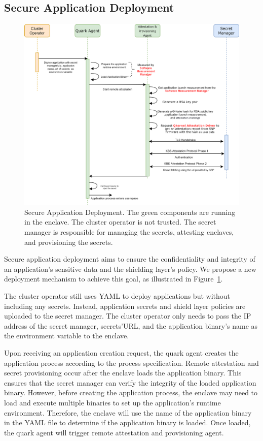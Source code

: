 \subsection{Secure Application Deployment}
\label{sec:secure_application_deployment}
\begin{figure}[!htb]
    \centering
    \includegraphics[height=0.5\textheight]{images/attestation_provisioning.png}
    \caption[Secure Application Deployment Workflow]{Secure Application Deployment. The green components are running in the enclave. The cluster operator is not trusted. The secret manager is responsible for managing the secrets, attesting enclaves, and provisioning the secrets.}
    \label{fig:attestation_provisioning}
\end{figure}

Secure application deployment aims to ensure the confidentiality and integrity of an application's sensitive data and the shielding layer's policy. We propose a new deployment mechanism to achieve this goal, as illustrated in Figure~\ref{fig:attestation_provisioning}.
 
The cluster operator still uses YAML to deploy applications but without including any secrets. Instead, application secrets and shield layer policies are uploaded to the secret manager. The cluster operator only needs to pass the IP address of the secret manager, secrets'URL, and the application binary's name as the environment variable to the 
enclave.

Upon receiving an application creation request, the quark agent creates the application process according to the process specification. Remote attestation and secret provisioning occur after the enclave loads the application binary. This ensures that the secret manager can verify the integrity of the loaded application binary. However, before creating the 
application process, the enclave may need to load and execute multiple binaries to set up the application's runtime environment. Therefore, the enclave will use the name of the application binary in the YAML file to determine if the application binary is loaded. Once loaded, the quark agent will trigger remote attestation and provisioning agent.
 

